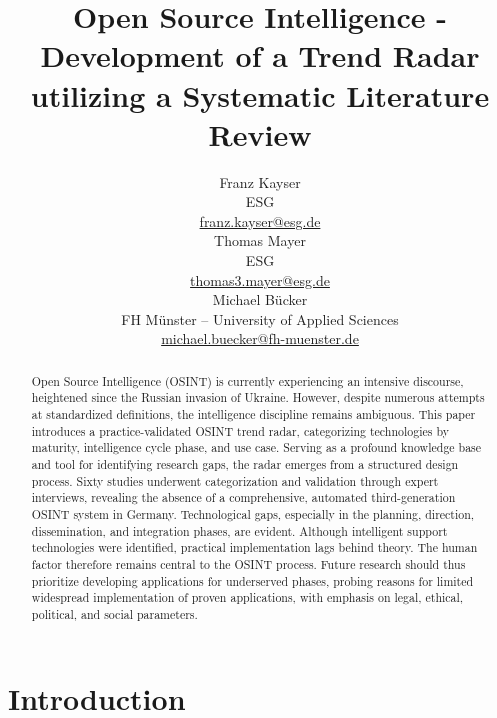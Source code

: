 \documentclass[10pt]{article}
\title{Open Source Intelligence - Development of a Trend Radar utilizing a Systematic Literature Review}
\author{Franz Kayser \\
  ESG \\
  {\underline{ franz.kayser@esg.de}} \\\And
  Thomas Mayer \\
  ESG  \\
  {\underline{ thomas3.mayer@esg.de} }\\\And 
  Michael Bücker \\
  FH Münster -- University of Applied Sciences\\
  {\underline{michael.buecker@fh-muenster.de}} \\}
\date{}
\begin{document}
\maketitle
\begin{abstract}


    Open Source Intelligence (OSINT) is currently experiencing an intensive discourse,
    heightened since the Russian invasion of Ukraine. However, despite numerous attempts
    at standardized definitions, the intelligence discipline remains ambiguous. This paper
    introduces a practice-validated OSINT trend radar, categorizing technologies by maturity,
    intelligence cycle phase, and use case. Serving as a profound knowledge base and tool for
    identifying research gaps, the radar emerges from a structured design process. Sixty
    studies underwent categorization and validation through expert interviews,
    revealing the absence of a comprehensive, automated third-generation OSINT
    system in Germany. Technological gaps, especially in the planning, direction,
    dissemination, and integration phases, are evident. Although intelligent support
    technologies were identified, practical implementation lags behind theory. The human
    factor therefore remains central to the OSINT process. Future research should thus
    prioritize developing applications for underserved phases, probing reasons for limited
    widespread implementation of proven applications, with emphasis on legal, ethical,
    political, and social parameters.


\end{abstract}

\section{Introduction}
\end{document}
